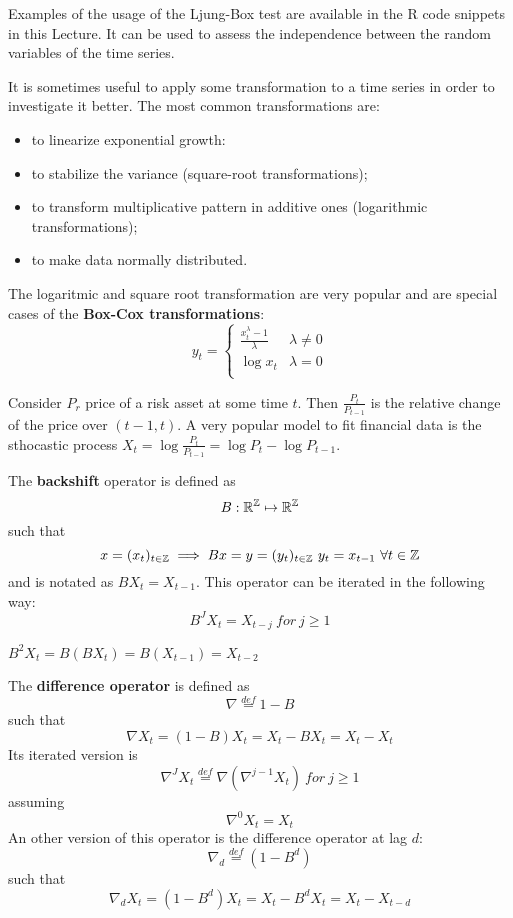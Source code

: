 Examples of the usage of the Ljung-Box test are available in the R code snippets in this Lecture. It can be used to assess the independence between the random variables of the time series.


It is sometimes useful to apply some transformation to a time series in order to investigate it better. The most common transformations are:
\begin{itemize}
    \item to linearize exponential growth:
    \item to stabilize the variance (square-root transformations);
    \item to transform multiplicative pattern in additive ones (logarithmic transformations);
    \item to make data normally distributed.
\end{itemize}

The logaritmic and square root transformation are very popular and are special cases of the \textbf{Box-Cox transformations}:
\[
    y_t=\begin{cases}
        \frac{x_t^\lambda-1}{\lambda}&\lambda\ne0\\
        \log x_t&\lambda=0\\
    \end{cases}  
\]

\begin{example}
    Consider $P_r$ price of a risk asset at some time $t$. Then $\frac{P_t}{P_{t-1}}$ is the relative change of the price over $(t-1,t)$. A very popular model to fit financial data is the sthocastic process $X_t=\log\frac{P_t}{P_{t-1}}=\log P_t-\log P_{t-1}$.
\end{example}

\begin{definition}
    The \textbf{backshift} operator is defined as
    \[
        B:\mathbb{R}^{\mathbb{Z}}\mapsto\mathbb{R}^{\mathbb{Z}}    
    \]
    such that
    \[
        x=(x_t)_{t\in\Z}\implies Bx=y=(y_t)_{t\in\Z}\ y_t=x_{t-1}\ \forall t\in\Z  
    \]
    and is notated as $BX_t=X_{t-1}$. This operator can be iterated in the following way:
    \[
        B^JX_t=X_{t-j}\ for\ j\ge1  
    \]
\end{definition}

\begin{example}
    $B^2X_t=B(BX_t)=B(X_{t-1})=X_{t-2}$
\end{example}

\begin{definition}
    The \textbf{difference operator} is defined as
    \[
        \nabla\stackrel{def}{=}1-B  
    \]
    such that
    \[
        \nabla X_t=(1-B)X_t=X_t-BX_t=X_t-X_t  
    \]
    Its iterated version is
    \[
        \nabla^JX_t\stackrel{def}{=}\nabla(\nabla^{j-1}X_t)\ for\ j\ge1
    \]
    assuming
    \[
        \nabla^0X_t=X_t  
    \]
    An other version of this operator is the difference operator at lag $d$:
    \[
        \nabla_d\stackrel{def}{=}(1-B^d)
    \]
    such that
    \[
        \nabla_d X_t=(1-B^d)X_t=X_t-B^dX_t=X_t-X_{t-d}  
    \]
\end{definition}

